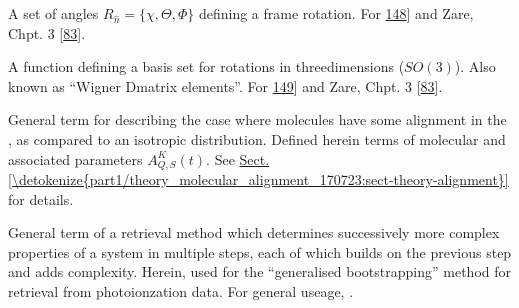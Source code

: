 \documentclass[letterpaper,table,10pt,english]{jupyterBook}
\begin{document}
\begin{description}
\sphinxAtStartPar
A set of angles \(R_{\hat{n}}=\{\chi,\Theta,\Phi\}\) defining a frame rotation. For \sphinxhref{https://en.wikipedia.org/wiki/Euler\_angles}{discussion see Wikipedia}{[}\hyperlink{cite.backmatter/bibliography:id958}{148}{]} and Zare, Chpt. 3 {[}\hyperlink{cite.backmatter/bibliography:id988}{83}{]}.

\sphinxAtStartPar
A function defining a basis set for rotations in three\sphinxhyphen{}dimensions (\(SO(3)\)). Also known as “Wigner D\sphinxhyphen{}matrix elements”. For \sphinxhref{https://en.wikipedia.org/wiki/Wigner\_D-matrix}{discussion see Wikipedia}{[}\hyperlink{cite.backmatter/bibliography:id962}{149}{]} and Zare, Chpt. 3 {[}\hyperlink{cite.backmatter/bibliography:id988}{83}{]}.

\sphinxAtStartPar
General term for describing the case where molecules have some alignment in the {\hyperref[\detokenize{backmatter/glossary:term-LF}]{}}, as compared to an isotropic distribution. Defined herein terms of molecular {\hyperref[\detokenize{backmatter/glossary:term-axis-distribution-moments}]{}} and associated parameters \(A_{Q,S}^{K}(t)\). See \hyperref[\detokenize{part1/theory_molecular_alignment_170723:sect-theory-alignment}]{Sect.\@ \ref{\detokenize{part1/theory_molecular_alignment_170723:sect-theory-alignment}}} for details.

\sphinxAtStartPar
General term of a retrieval method which determines successively more complex properties of a system in multiple steps, each of which builds on the previous step and adds complexity. Herein, used for the “generalised bootstrapping” method for {\hyperref[\detokenize{backmatter/glossary:term-radial-matrix-elements}]{}} retrieval from photoionzation data. For general useage, .

\end{description}
\end{document}
